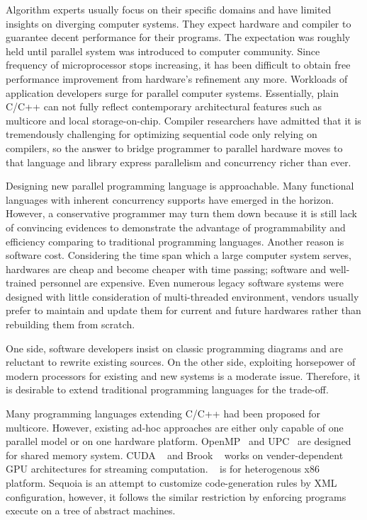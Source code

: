\documentclass[10pt, conference, compsocconf]{IEEEtran}
\begin{document}
Algorithm experts usually focus on their specific domains and have
limited insights on diverging computer systems. They expect hardware
and compiler to guarantee decent performance for their
programs. The expectation was roughly held until parallel system was
introduced to computer community. Since frequency of microprocessor
stops increasing, it has been difficult to obtain free
performance improvement from hardware's refinement any more. Workloads
of application developers surge for parallel computer
systems. Essentially, plain C/C++ can not fully reflect contemporary
architectural features such as multicore and local
storage-on-chip. Compiler researchers have admitted that it is
tremendously challenging for optimizing sequential code only relying
on compilers, so the answer to bridge programmer to parallel hardware
moves to that language and library express parallelism and concurrency richer than ever.

Designing new parallel programming language is approachable. Many
functional languages  with inherent concurrency supports have emerged
in the horizon. However, a conservative programmer may
turn them down because it is still lack of convincing evidences to
demonstrate the advantage of programmability and efficiency comparing to traditional
programming languages. Another reason is software cost. Considering
the time span which a large computer system serves, hardwares are
cheap and become cheaper with time passing; software and well-trained
personnel are expensive. Even numerous legacy software systems were designed with little consideration of multi-threaded environment, vendors usually prefer to maintain and update them for current and future hardwares rather than rebuilding them from scratch. 

One side, software developers insist on classic programming diagrams
and are reluctant to rewrite existing sources. On the other side,
exploiting horsepower of modern processors for existing and new
systems is a moderate issue. Therefore, it is desirable to extend
traditional programming languages for the trade-off.

Many programming languages extending C/C++ had been proposed for
multicore. However,  existing ad-hoc approaches are either only
capable of one parallel model or on one hardware
platform. OpenMP~\cite{openmp} and UPC~\cite{upc}  are designed for shared memory system. CUDA ~\cite{cudaref} and
Brook ~\cite{brookgpu} works on vender-dependent GPU architectures for streaming
computation. ~\cite{saha09} is for heterogenous x86 platform.
Sequoia \cite{sequoia, sequoia-compiler} is an attempt to customize
code-generation rules by XML configuration, however, it follows the
similar restriction by enforcing programs execute on a tree of
abstract machines.
\end{document}
